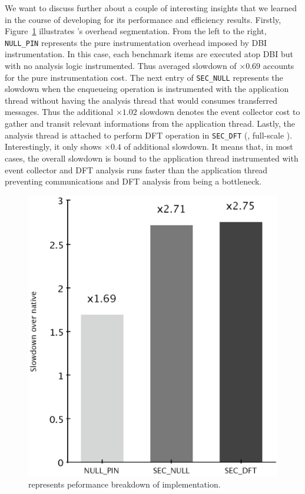 We want to discuss further about a couple of interesting insights that we
learned in the course of developing \sreplica for its performance and
efficiency results. Firstly, Figure~\ref{fig:sreplica0} illustrates \sreplica's
overhead segmentation. From the left to the right, {\tt NULL\_PIN} represents
the pure instrumentation overhead imposed by DBI instrumentation. In this case,
each benchmark items are executed atop \pin DBI but with no analysis logic
instrumented.  Thus averaged slowdown of $\times 0.69$ accounts for the pure
instrumentation cost. The next entry of {\tt SEC\_NULL} represents the slowdown
when the enqueueing operation is instrumented with the application thread
without having the analysis thread that would consumes transferred messages.
Thus the additional $\times 1.02$ slowdown denotes the event collector cost to
gather and transit relevant informations from the application thread.  Lastly,
the analysis thread is attached to perform DFT operation in {\tt SEC\_DFT}
(\ie, full-scale \sreplica).  Interestingly, it only shows $\times 0.4$ of
additional slowdown. It means that, in most cases, the overall slowdown is
bound to the application thread instrumented with event collector and DFT
analysis runs faster than the application thread preventing communications and
DFT analysis from being a bottleneck.

\begin{figure}[tb]
    \centering
    \includegraphics[width=0.33\linewidth]{figs/sreplica0.eps}
    \caption{represents peformance breakdown of \sreplica implementation.
    \label{fig:sreplica0}}
\end{figure}

